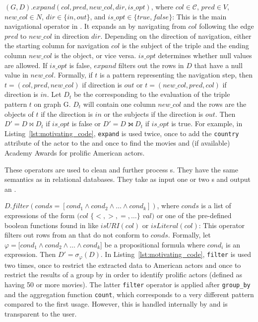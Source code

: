 \begin{sloppypar}
  \item $(G, D).expand(col, pred, new\_col, dir, is\_opt)$, where $col \in \mathcal{C}$, $pred \in V$, $new\_col \in N$, $dir \in \{in, out\}$, and $is\_opt \in \{true, false\}$: 
	This is the main navigational operator in \rdfframes. It expands an \rdfframe by navigating from $col$ following the edge $pred$ to $new\_col$ in direction $dir$. 
	Depending on the direction of navigation, either the starting column for navigation $col$ is the subject of the triple and the ending column $new\_col$ is the object, or vice versa.
	$is\_opt$ determines whether null values are allowed. If $is\_opt$ is false, $expand$ filters out the rows in $D$ that have a null value in $new\_col$. Formally, if $t$ is a \sparql pattern representing the navigation step,
	then $t = (col, pred, new\_col)$ if direction is $out$ or $t = (new\_col, pred, col)$ if direction is $in$. 
	Let $D_{t}$ be the \rdfframe 
  corresponding to the evaluation of the triple pattern $t$ on graph G. $D_{t}$ will contain one column $new\_col$ and the rows are the objects of $t$ if the direction is $in$ or the subjects if the direction is $out$. 
  Then $D' = D \Join D_{t}$ if $is\_opt$ is false or $D' = D \leftouterjoin D_{t}$ if $is\_opt$ is true.
  For example, in Listing~\ref{lst:motivating_code}, \texttt{expand} is used twice,
  once to add the \texttt{country} attribute of the actor to the \rdfframe and once to find the movies and (if available) Academy Awards for prolific American actors.
\end{sloppypar}
  

\squishend



 These operators are used to clean and further process {\rdfframe}s.
They have the same semantics as in relational databases.
They take as input one or two {\rdfframe}s and output an \rdfframe.

\squishlist
	\item $D.filter(conds = [cond_1 \land cond_2 \land \ldots \land cond_k])$, where $conds$ is a list of expressions of the form $(col$ $\{<, >, =, \ldots\}$ $val)$ or one of the pre-defined boolean functions found in \sparql like $isURI(col)$ or $isLiteral(col)$: This operator filters out rows from an \rdfframe that do not conform to $conds$.
	Formally, let $\varphi = [cond_1 \land cond_2 \land \ldots \land cond_k$] be a propositional formula where $cond_i$ is an expression. 
	Then $D' = \sigma_{\varphi}(D)$.
	In Listing~\ref{lst:motivating_code}, \texttt{filter} is used two times, once to restrict the extracted data to American actors and once to restrict the results of a group by in order to identify prolific actors
  (defined as having 50 or more movies).
  The latter \texttt{filter} operator is applied
  after \texttt{group\_by} and the aggregation function \texttt{count}, which corresponds to a very different \sparql pattern compared to the first usage. However, this is handled internally by \rdfframes and is transparent to the user.

